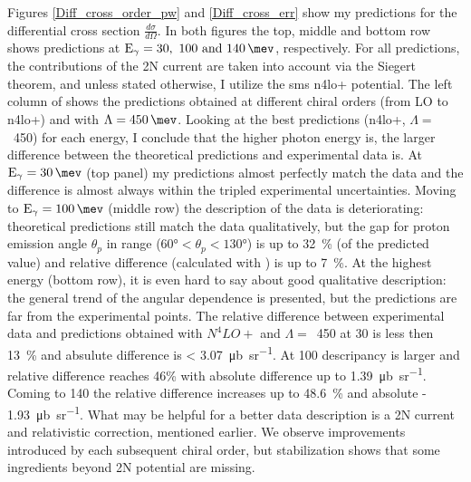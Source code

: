         
    Figures \ref{Diff_cross_order_pw} and \ref{Diff_cross_err} show my predictions 
    for the differential cross section
    $\frac{d\sigma}{d\Omega}$.
    In both figures the top, middle and bottom row shows predictions at 
    $\text{E}_\gamma = \SIlist[list-units = single]{30;100;140}{\mev}$, respectively.
    For all predictions, the contributions of the 2N current are taken into account via the Siegert theorem,
    and unless stated otherwise, I utilize the \gls{sms} \gls{n4lo+} potential.
    The left column of  shows the predictions obtained at 
    different chiral orders (from LO to \gls{n4lo+}) and with $\Lambda=\SI{450}{\mev}$.
    Looking at the best predictions (\gls{n4lo+}, $\Lambda=$~\SI{450}{\mev}) for each
    energy, I
    conclude that the higher photon energy is, the larger 
    difference between the theoretical predictions and experimental 
    data is. At $\text{E}_\gamma = \SI{30}{\mev}$ (top panel) my predictions
    almost perfectly match the data and the difference is almost always
    within the tripled experimental uncertainties. 
    Moving to  $\text{E}_\gamma=\SI{100}{\mev}$ (middle row)
    the description of the data is deteriorating: theoretical
    predictions still match the data qualitatively, but
    the gap for proton emission angle $\theta_p$ in range ($\ang{60} < \theta_p < \ang{130}$) 
    is up to \SI{32}{\percent} (of the predicted value)
    and relative difference (calculated with ) is up to
    \SI{7}{\percent}.
    At the highest energy (bottom row), it is even hard to say about 
    good qualitative description: the general trend of the
    angular dependence is presented, but the predictions are 
    far from the experimental points.
    The relative difference between experimental data and predictions obtained with $N^4LO+$ and $\Lambda=$~\SI{450}{\mev} at \SI{30}{\mev} is less then \SI{13}{\percent}
    and absulute difference is < \SI{3.07}{\micro \barn \per \steradian}.
    At \SI{100}{\mev} descripancy is larger and relative difference reaches 46\% with absolute difference up to \SI{1.39}{\micro \barn \per \steradian}.
    Coming to \SI{140}{\mev} the relative difference 
    increases up to \SI{48.6}{\percent} and absolute - \SI{1.93}{\micro \barn \per \steradian}.
    What may be helpful
    for a better data description is a 2N current 
    and relativistic correction, mentioned earlier.
    We observe improvements introduced by each subsequent chiral order, but 
    stabilization shows that some ingredients beyond 2N potential are missing.

